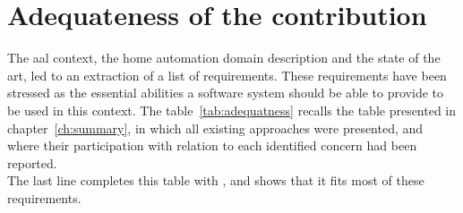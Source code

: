 \section{Adequateness of the contribution}

The \gls{aal} context, the home automation domain description and the state of the art, led to an extraction of a list of requirements. These requirements have been stressed as the essential abilities a software system should be able to provide to be used in this context. The table~\ref{tab:adequatness} recalls the table presented in chapter~\ref{ch:summary}, in which all existing approaches were presented, and where their participation with relation to each identified concern had been reported.\\
The last line completes this table with \enti{}, and shows that it fits most of these requirements.\\

